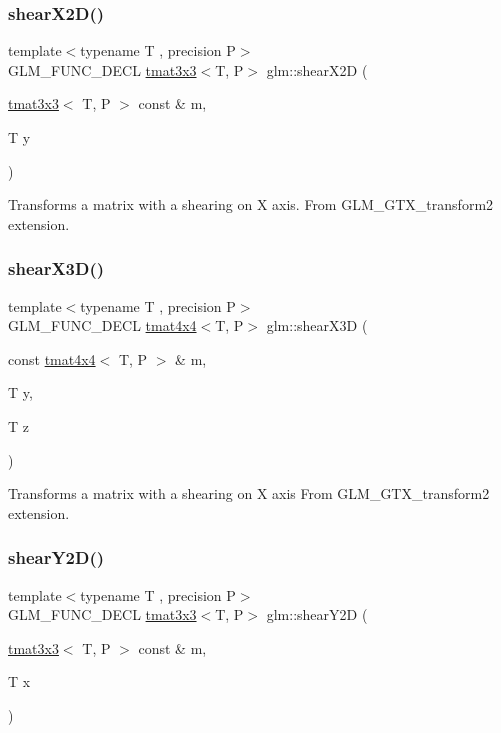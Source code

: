 \subsubsection{\texorpdfstring{shear\+X2\+D()}{shearX2D()}}
{\footnotesize\ttfamily template$<$typename T , precision P$>$ \\
G\+L\+M\+\_\+\+F\+U\+N\+C\+\_\+\+D\+E\+CL \hyperlink{structglm_1_1tmat3x3}{tmat3x3}$<$T, P$>$ glm\+::shear\+X2D (\begin{DoxyParamCaption}\item[{\hyperlink{structglm_1_1tmat3x3}{tmat3x3}$<$ T, P $>$ const \&}]{m,  }\item[{T}]{y }\end{DoxyParamCaption})}

Transforms a matrix with a shearing on X axis. From G\+L\+M\+\_\+\+G\+T\+X\+\_\+transform2 extension. \mbox{\label{group__gtx__transform2_gae06ce274e4754f925d5d68440e89452e}} 
\subsubsection{\texorpdfstring{shear\+X3\+D()}{shearX3D()}}
{\footnotesize\ttfamily template$<$typename T , precision P$>$ \\
G\+L\+M\+\_\+\+F\+U\+N\+C\+\_\+\+D\+E\+CL \hyperlink{structglm_1_1tmat4x4}{tmat4x4}$<$T, P$>$ glm\+::shear\+X3D (\begin{DoxyParamCaption}\item[{const \hyperlink{structglm_1_1tmat4x4}{tmat4x4}$<$ T, P $>$ \&}]{m,  }\item[{T}]{y,  }\item[{T}]{z }\end{DoxyParamCaption})}

Transforms a matrix with a shearing on X axis From G\+L\+M\+\_\+\+G\+T\+X\+\_\+transform2 extension. \mbox{\label{group__gtx__transform2_ga21ade82859e09a5cdaf4a01fbf8dc61b}} 
\subsubsection{\texorpdfstring{shear\+Y2\+D()}{shearY2D()}}
{\footnotesize\ttfamily template$<$typename T , precision P$>$ \\
G\+L\+M\+\_\+\+F\+U\+N\+C\+\_\+\+D\+E\+CL \hyperlink{structglm_1_1tmat3x3}{tmat3x3}$<$T, P$>$ glm\+::shear\+Y2D (\begin{DoxyParamCaption}\item[{\hyperlink{structglm_1_1tmat3x3}{tmat3x3}$<$ T, P $>$ const \&}]{m,  }\item[{T}]{x }\end{DoxyParamCaption})}

